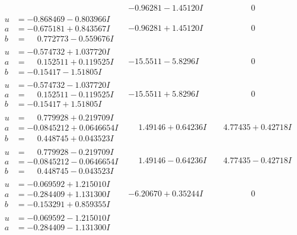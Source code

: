 \documentclass[1p]{elsarticle_modified}
\theoremstyle{definition}
\begin{document}
$$\begin{array}{c|c|c}
 & -0.96281 - 1.45120 I & \phantom{-0.000000 } 0 \\ \hline\begin{aligned}
u &= -0.868469 - 0.803966 I \\
a &= -0.675181 + 0.843567 I \\
b &= \phantom{-}0.772773 - 0.559676 I\end{aligned}
 & -0.96281 + 1.45120 I & \phantom{-0.000000 } 0 \\ \hline\begin{aligned}
u &= -0.574732 + 1.037720 I \\
a &= \phantom{-}0.152511 + 0.119525 I \\
b &= -0.15417 - 1.51805 I\end{aligned}
 & -15.5511 - 5.8296 I & \phantom{-0.000000 } 0 \\ \hline\begin{aligned}
u &= -0.574732 - 1.037720 I \\
a &= \phantom{-}0.152511 - 0.119525 I \\
b &= -0.15417 + 1.51805 I\end{aligned}
 & -15.5511 + 5.8296 I & \phantom{-0.000000 } 0 \\ \hline\begin{aligned}
u &= \phantom{-}0.779928 + 0.219709 I \\
a &= -0.0845212 + 0.0646654 I \\
b &= \phantom{-}0.448745 + 0.043523 I\end{aligned}
 & \phantom{-}1.49146 + 0.64236 I & \phantom{-}4.77435 + 0.42718 I \\ \hline\begin{aligned}
u &= \phantom{-}0.779928 - 0.219709 I \\
a &= -0.0845212 - 0.0646654 I \\
b &= \phantom{-}0.448745 - 0.043523 I\end{aligned}
 & \phantom{-}1.49146 - 0.64236 I & \phantom{-}4.77435 - 0.42718 I \\ \hline\begin{aligned}
u &= -0.069592 + 1.215010 I \\
a &= -0.284409 + 1.131300 I \\
b &= -0.153291 + 0.859355 I\end{aligned}
 & -6.20670 + 0.35244 I & \phantom{-0.000000 } 0 \\ \hline\begin{aligned}
u &= -0.069592 - 1.215010 I \\
a &= -0.284409 - 1.131300 I \\

\end{aligned}
\end{array}$$
\end{document}
